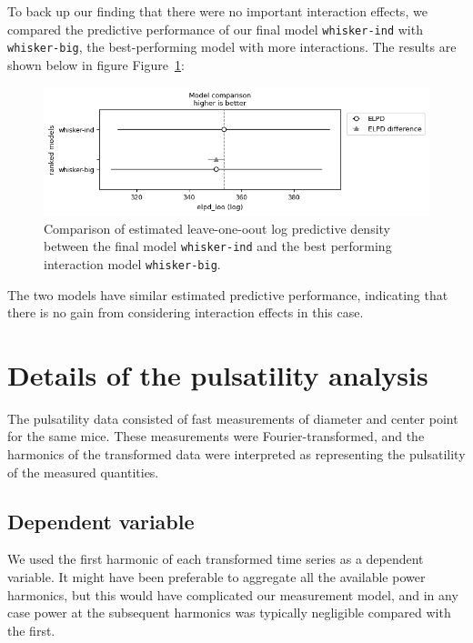 \documentclass[
  letterpaper,
  DIV=11,
  numbers=noendperiod,
  oneside]{scrartcl}
\theoremstyle{plain}
\theoremstyle{remark}
\begin{document}
To back up our finding that there were no important interaction effects,
we compared the predictive performance of our final model
\texttt{whisker-ind} with \texttt{whisker-big}, the best-performing
model with more interactions. The results are shown below in figure
Figure~\ref{fig-whisker-loo-compare}:

\begin{figure}

\begin{minipage}{\linewidth}

\includegraphics{../plots/whisker-loo-compare.png}

\end{minipage}%

\caption{\label{fig-whisker-loo-compare}Comparison of estimated
leave-one-oout log predictive density between the final model
\texttt{whisker-ind} and the best performing interaction model
\texttt{whisker-big}.}

\end{figure}%

The two models have similar estimated predictive performance, indicating
that there is no gain from considering interaction effects in this case.

\section{Details of the pulsatility
analysis}\label{details-of-the-pulsatility-analysis}

The pulsatility data consisted of fast measurements of diameter and
center point for the same mice. These measurements were
Fourier-transformed, and the harmonics of the transformed data were
interpreted as representing the pulsatility of the measured quantities.

\subsection{Dependent variable}\label{dependent-variable-1}

We used the first harmonic of each transformed time series as a
dependent variable. It might have been preferable to aggregate all the
available power harmonics, but this would have complicated our
measurement model, and in any case power at the subsequent harmonics was
typically negligible compared with the first.
\end{document}
